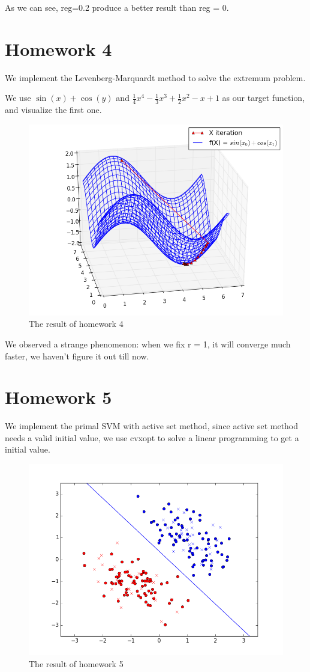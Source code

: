 \documentclass[12pt]{article}
\begin{document}
As we can see, reg=0.2 produce a better result than reg = 0.

\section{Homework 4}

We implement the Levenberg-Marquardt method to solve the extremum problem.

We use $\sin(x) + \cos(y)$ and $\frac{1}{4}x^4 - \frac{1}{3}x^3 + \frac{1}{2}x^2 - x + 1$ as our target function, and visualize the first one.

\begin{figure}[hbtp]
  \includegraphics[width=\textwidth]{hw4_result.png}
  \caption{The result of homework 4}
\end{figure}

We observed a strange phenomenon: when we fix r = 1,  it will converge much faster, we haven't figure it out till now.


\section{Homework 5}

We implement the primal SVM with active set method, since active set method needs a valid initial value, we use cvxopt to solve a linear programming to get a initial value.

\begin{figure}[hbt]
  \includegraphics[width=\textwidth]{hw5_result.png}
  \caption{The result of homework 5}
\end{figure}
\end{document}
